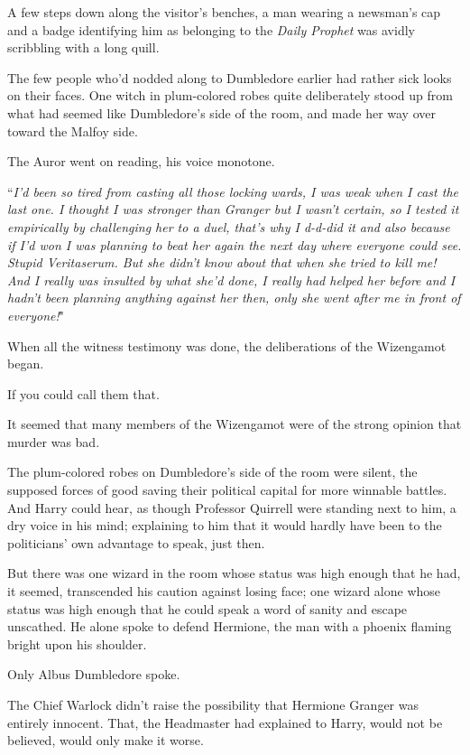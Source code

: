 A few steps down along the visitor's benches, a man wearing a newsman's cap and a badge identifying him as belonging to the \emph{Daily Prophet} was avidly scribbling with a long quill.

The few people who'd nodded along to Dumbledore earlier had rather sick looks on their faces. One witch in plum-colored robes quite deliberately stood up from what had seemed like Dumbledore's side of the room, and made her way over toward the Malfoy side.

The Auror went on reading, his voice monotone.

``\emph{I'd been so tired from casting all those locking wards, I was weak when I cast the last one. I thought I was stronger than Granger but I wasn't certain, so I tested it empirically by challenging her to a duel, that's why I d-d-did it and also because if I'd won I was planning to beat her again the next day where everyone could see. Stupid Veritaserum. But \emph{she} didn't know about that when she tried to \emph{kill} me! And I really was insulted by what she'd done, I really had helped her before and I hadn't been planning anything against her then, only \emph{she} went after \emph{me} in front of everyone!}"

When all the witness testimony was done, the deliberations of the Wizengamot began.

If you could call them that.

It seemed that many members of the Wizengamot were of the strong opinion that murder was bad.

The plum-colored robes on Dumbledore's side of the room were silent, the supposed forces of good saving their political capital for more winnable battles. And Harry could hear, as though Professor Quirrell were standing next to him, a dry voice in his mind; explaining to him that it would hardly have been to the politicians' own advantage to speak, just then.

But there was one wizard in the room whose status was high enough that he had, it seemed, transcended his caution against losing face; one wizard alone whose status was high enough that he could speak a word of sanity and escape unscathed. He alone spoke to defend Hermione, the man with a phoenix flaming bright upon his shoulder.

Only Albus Dumbledore spoke.

The Chief Warlock didn't raise the possibility that Hermione Granger was entirely innocent. That, the Headmaster had explained to Harry, would not be believed, would only make it worse.

